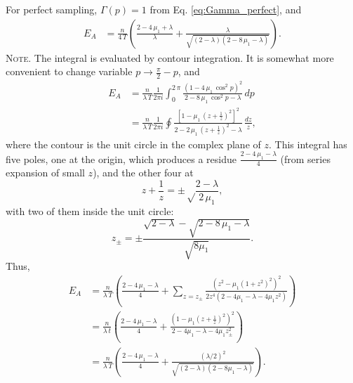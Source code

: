 \documentclass[reprint, floatfix]{revtex4-1}
\newcommand{\note}[1]{{\color{DarkGreen}\footnotesize \textsc{Note.} #1}}
\newcommand{\Err}{E}
\begin{document}
For perfect sampling,
$\Gamma(p) = 1$ from Eq. \eqref{eq:Gamma_perfect},
and
$$
\begin{aligned}
  \Err_A
  &=
  \frac{n}{4 \, T}
  \left(
    \frac{2 - 4 \, \mu_1 + \lambda}{ \lambda }
    +
    \frac{ \lambda }
    { \sqrt{ (2 - \lambda) (2 - 8 \, \mu_1 - \lambda) } }
  \right)
.
\end{aligned}
$$
\note{The integral is evaluated by contour integration.
%
It is somewhat more convenient to change variable $p \to \frac{ \pi } { 2 } - p$,
and
$$
\begin{aligned}
  \Err_A
  &=
  \frac{n}{\lambda \, T}
  \frac{1}{2 \pi i}
  \int_0^{2 \, \pi}
  \frac{ \left(1 - 4 \, \mu_1 \, \cos^2 p \right)^2 }
  { 2 - 8 \, \mu_1 \, \cos^2 p - \lambda }
  \, dp
  \\
  &=
  \frac{n}{\lambda \, T}
  \frac{1}{2 \pi i}
  \oint
  \frac{ \left[1 - \mu_1 \, \left(z+\frac{1}{z}\right)^2 \right]^2 }
  { 2 - 2 \, \mu_1 \, \left(z + \frac{1}{z}\right)^2 - \lambda }
  \, \frac{dz}{z}
  ,
\end{aligned}
$$
where the contour is the unit circle
in the complex plane of $z$.
%
This integral has five poles, one at the origin,
which produces a residue
$\frac{2 - 4 \, \mu_1 - \lambda}{4}$
(from series expansion of small $z$),
and the other four at
$$
z + \frac{1}{z} = \pm\sqrt\frac{2-\lambda}{2 \, \mu_1},
$$
with two of them inside the unit circle:
$$
z_\pm = \pm \frac{\sqrt{2-\lambda} -\sqrt{2 - 8 \, \mu_1 - \lambda}}
{\sqrt{8 \mu_1}}.
$$
Thus,
$$
\begin{aligned}
\Err_A
&=
\frac{      n       }
     { \lambda \, T }
\left(
 \frac{ 2 - 4 \, \mu_1 - \lambda }
      {          4               }
 +
 \sum_{z = z_{\pm} }
 \frac{ \left(z^2 - \mu_1 (1 + z^2)^2 \right)^2 }
 { 2 z^4 (2 - 4 \mu_1 - \lambda - 4 \mu_1 z^2) }
\right)
\\
&=
\frac{       n      }
     { \lambda \, t }
\left(
  \frac{ 2 - 4 \, \mu_1 - \lambda }
       {          4               }
 +
 \frac{ \left(1 - \mu_1 \left(z + \frac{1}{z} \right)^2 \right)^2 }
      { 2 - 4 \mu_1 - \lambda - 4 \mu_1 z_{\pm}^2                 }
\right)
\\
&=
\frac{       n      }
     { \lambda \, T }
\left(
  \frac{ 2 - 4 \, \mu_1 - \lambda }
       {          4               }
 +
 \frac{ (\lambda/2)^2 }
 { \sqrt{(2-\lambda) (2 - 8 \mu_1 -\lambda)} }
\right).
\end{aligned}
$$
}
\end{document}
